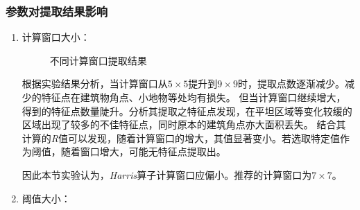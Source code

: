     \subsubsection{参数对提取结果影响}
    \begin{enumerate}
        \item 计算窗口大小：
        
        \begin{figure}[H]
            \centering
            \caption{不同计算窗口提取结果}
            \label{harriscalwinpic}
        \end{figure}
        \hspace{20pt}根据实验结果分析，当计算窗口从$5 \times 5$提升到$9 \times 9$时，提取点数逐渐减少。减少的特征点在建筑物角点、小地物等处均有损失。
        但当计算窗口继续增大，得到的特征点数量陡升。分析其提取之特征点发现，在平坦区域等变化较缓的区域出现了较多的不佳特征点，同时原本的建筑角点亦大面积丢失。
        结合其计算的\textit{R}值可以发现，随着计算窗口的增大，其值显著变小。若选取特定值作为阈值，随着窗口增大，可能无特征点提取出。

        \hspace{20pt}因此本节实验认为，\textit{Harris}算子计算窗口应偏小。推荐的计算窗口为$7 \times 7$。
        \item 阈值大小：
        

\end{enumerate}
